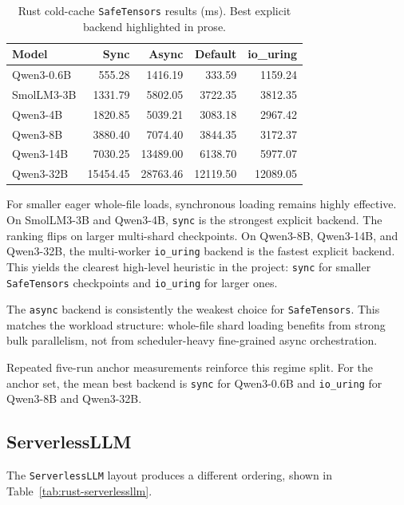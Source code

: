 \begin{table}[h]
\caption{Rust cold-cache \texttt{SafeTensors} results (ms). Best explicit backend highlighted in prose.}
\label{tab:rust-safetensors}
\centering
\begin{tabular}{lrrrr}
\toprule
Model & Sync & Async & Default & io\_uring \\
\midrule
Qwen3-0.6B & 555.28 & 1416.19 & 333.59 & 1159.24 \\
SmolLM3-3B & 1331.79 & 5802.05 & 3722.35 & 3812.35 \\
Qwen3-4B & 1820.85 & 5039.21 & 3083.18 & 2967.42 \\
Qwen3-8B & 3880.40 & 7074.40 & 3844.35 & 3172.37 \\
Qwen3-14B & 7030.25 & 13489.00 & 6138.70 & 5977.07 \\
Qwen3-32B & 15454.45 & 28763.46 & 12119.50 & 12089.05 \\
\bottomrule
\end{tabular}
\end{table}

For smaller eager whole-file loads, synchronous loading remains highly effective. On SmolLM3-3B and Qwen3-4B, \texttt{sync} is the strongest explicit backend. The ranking flips on larger multi-shard checkpoints. On Qwen3-8B, Qwen3-14B, and Qwen3-32B, the multi-worker \texttt{io\_uring} backend is the fastest explicit backend. This yields the clearest high-level heuristic in the project: \texttt{sync} for smaller \texttt{SafeTensors} checkpoints and \texttt{io\_uring} for larger ones.

The \texttt{async} backend is consistently the weakest choice for \texttt{SafeTensors}. This matches the workload structure: whole-file shard loading benefits from strong bulk parallelism, not from scheduler-heavy fine-grained async orchestration.

Repeated five-run anchor measurements reinforce this regime split. For the anchor set, the mean best backend is \texttt{sync} for Qwen3-0.6B and \texttt{io\_uring} for Qwen3-8B and Qwen3-32B.

\subsection{ServerlessLLM}

The \texttt{ServerlessLLM} layout produces a different ordering, shown in Table~\ref{tab:rust-serverlessllm}.

